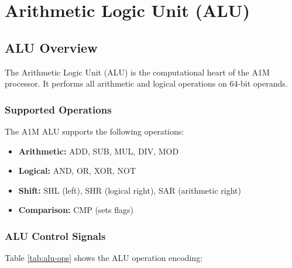 \documentclass[12pt,a4paper,oneside]{book}
\begin{document}
\chapter{Arithmetic Logic Unit (ALU)}

\section{ALU Overview}

The Arithmetic Logic Unit (ALU) is the computational heart of the A1M processor. It performs all arithmetic and logical operations on 64-bit operands.

\subsection{Supported Operations}

The A1M ALU supports the following operations:

\begin{itemize}
    \item \textbf{Arithmetic:} ADD, SUB, MUL, DIV, MOD
    \item \textbf{Logical:} AND, OR, XOR, NOT
    \item \textbf{Shift:} SHL (left), SHR (logical right), SAR (arithmetic right)
    \item \textbf{Comparison:} CMP (sets flags)
\end{itemize}

\subsection{ALU Control Signals}

Table \ref{tab:alu-ops} shows the ALU operation encoding:
\end{document}
